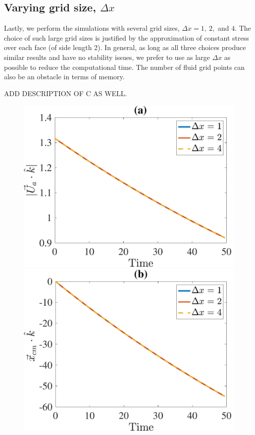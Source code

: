 \subsection{Varying grid size, $\Delta x$}
Lastly, we perform the simulations with several grid sizes, $\Delta x = 1, \ 2, $ and $4$. 
The choice of such large grid sizes is justified by the approximation of constant stress over each face (of side length 2).
In general, as long as all three choices produce similar results and have no stability issues, we prefer to use as large $\Delta x$ as possible to reduce the computational time. 
The number of fluid grid points can also be an obstacle in terms of memory. 
\par
{\color{red} ADD DESCRIPTION OF C AS WELL.}
\begin{figure}[ht]
	\begin{center}
		\includegraphics[scale=0.35]{./figures/fig_NC10_dx_Ua3_all}
		\includegraphics[scale=0.35]{./figures/fig_NC10_dx_cm3_all}

\end{center}
\end{figure}
